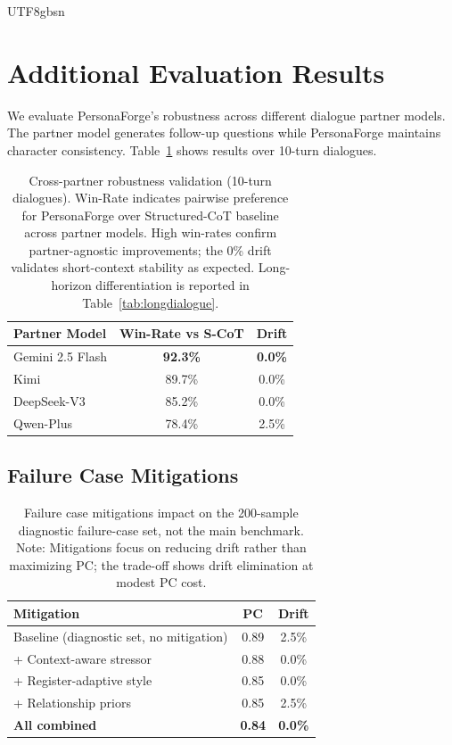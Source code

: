 \documentclass[11pt]{article}
\begin{document}
\begin{CJK*}{UTF8}{gbsn}
\section{Additional Evaluation Results}
\label{sec:crosspartner}

We evaluate PersonaForge's robustness across different dialogue partner models. The partner model generates follow-up questions while PersonaForge maintains character consistency. Table~\ref{tab:crosspartner} shows results over 10-turn dialogues.

\begin{table}[h]
\centering
\small
\begin{tabular}{lcc}
\toprule
\textbf{Partner Model} & \textbf{Win-Rate vs S-CoT} & \textbf{Drift} \\
\midrule
Gemini 2.5 Flash & \textbf{92.3\%} & \textbf{0.0\%} \\
Kimi & 89.7\% & 0.0\% \\
DeepSeek-V3 & 85.2\% & 0.0\% \\
Qwen-Plus & 78.4\% & 2.5\% \\
\bottomrule
\end{tabular}
\caption{Cross-partner robustness validation (10-turn dialogues). Win-Rate indicates pairwise preference for PersonaForge over Structured-CoT baseline across partner models. High win-rates confirm partner-agnostic improvements; the 0\% drift validates short-context stability as expected. Long-horizon differentiation is reported in Table~\ref{tab:longdialogue}.}
\label{tab:crosspartner}
\end{table}


\subsection{Failure Case Mitigations}
\label{sec:mitigation}

\begin{table}[h]
\centering
\small
\begin{tabular}{lcc}
\toprule
\textbf{Mitigation} & \textbf{PC} & \textbf{Drift} \\
\midrule
Baseline (diagnostic set, no mitigation) & 0.89 & 2.5\% \\
+ Context-aware stressor & 0.88 & 0.0\% \\
+ Register-adaptive style & 0.85 & 0.0\% \\
+ Relationship priors & 0.85 & 2.5\% \\
\textbf{All combined} & \textbf{0.84} & \textbf{0.0\%} \\
\bottomrule
\end{tabular}
\caption{Failure case mitigations impact on the 200-sample diagnostic failure-case set, not the main benchmark. Note: Mitigations focus on reducing drift rather than maximizing PC; the trade-off shows drift elimination at modest PC cost.}
\label{tab:mitigations}
\end{table}


\end{CJK*}
\end{document}
